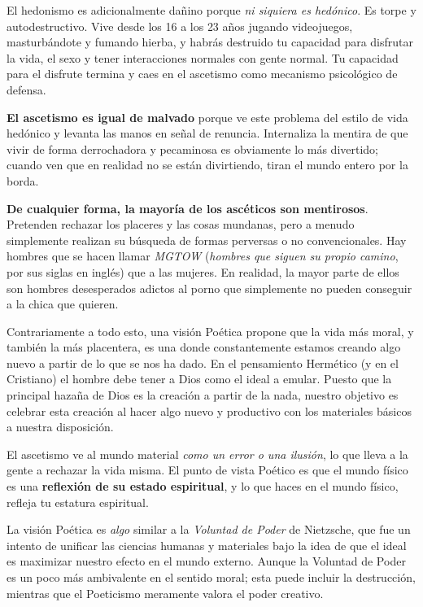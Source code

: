 \documentclass{article}
\begin{document}
	El hedonismo es adicionalmente dañino porque \textit{ni siquiera es
	hedónico}. Es torpe y autodestructivo. Vive desde los 16 a los 23
	años jugando videojuegos, masturbándote y fumando hierba, y habrás
	destruido tu capacidad para disfrutar la vida, el sexo y tener
	interacciones normales con gente normal. Tu capacidad para el disfrute
	termina y caes en el ascetismo como mecanismo psicológico de defensa.

	\textbf{El ascetismo es igual de malvado} porque ve este problema del
	estilo de vida hedónico y levanta las manos en señal de renuncia.
	Internaliza la mentira de que vivir de forma derrochadora y pecaminosa
	es obviamente lo más divertido; cuando ven que en realidad no se están
	divirtiendo, tiran el mundo entero por la borda.

	\textbf{De cualquier forma, la mayoría de los ascéticos son mentirosos}.
	Pretenden rechazar los placeres y las cosas mundanas, pero a menudo
	simplemente realizan su búsqueda de formas perversas o no convencionales.
	Hay hombres que se hacen llamar \textit{MGTOW} (\textit{hombres que
	siguen su propio camino}, por sus siglas en inglés) que
	 a las mujeres. En realidad, la mayor parte de
	ellos son hombres desesperados adictos al porno que simplemente no
	pueden conseguir a la chica que quieren.

	Contrariamente a todo esto, una visión Poética propone que la
	vida más moral, y también la más placentera, es una donde constantemente
	estamos creando algo nuevo a partir de lo que se nos ha dado.
	En el pensamiento Hermético (y en el Cristiano) el hombre debe tener
	a Dios como el ideal a emular. Puesto que la principal hazaña de Dios
	es la creación a partir de la nada, nuestro objetivo es celebrar esta
	creación al hacer algo nuevo y productivo con los materiales básicos
	a nuestra disposición.

	El ascetismo ve al mundo material \textit{como un error o una ilusión},
	lo que lleva a la gente a rechazar la vida misma. El punto de vista
	Poético es que el mundo físico es una \textbf{reflexión de su estado
	espiritual}, y lo que haces en el mundo físico, refleja tu estatura
	espiritual.

	La visión Poética es \textit{algo} similar a la \textit{Voluntad de
	Poder} de Nietzsche, que fue un intento de unificar las ciencias humanas
	y materiales bajo la idea de que el ideal es maximizar nuestro efecto en
	el mundo externo. Aunque la Voluntad de Poder es un poco más ambivalente
	en el sentido moral; esta puede incluir la destrucción, mientras que el
	Poeticismo meramente valora el poder creativo.
\end{document}
